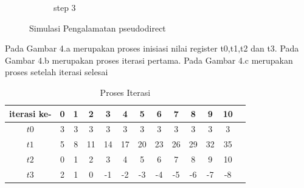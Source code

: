 \documentclass{class}
\begin{document}
\begin{enumerate}
\begin{figure}[H]
\begin{subfigure}{0.5\textwidth}
              \caption{step 3}
              \label{pseudodirect2}
            \end{subfigure}
          \caption{Simulasi Pengalamatan pseudodirect}
          \label{Immediete}
          \end{figure}
      
      Pada Gambar 4.a merupakan proses inisiasi nilai register t0,t1,t2 dan t3.
      Pada Gambar 4.b merupakan proses iterasi pertama.
      Pada Gambar 4.c merupakan proses setelah iterasi selesai

      \begin{table}[H]
          \begin{tabular}{|c|c|c|c|c|c|c|c|c|c|c|c|c|}
              \hline
              iterasi ke- & 0 & 1 & 2 & 3 & 4 & 5 & 6 & 7 & 8 & 9 & 10\\ \hline
              $t0$ & 3 & 3 & 3 & 3 & 3 & 3 & 3 & 3 & 3 & 3 &3 \\ \hline
              $t1$ & 5 & 8 & 11 & 14 & 17 & 20 & 23 & 26 & 29 & 32 &35\\ \hline
              $t2$ & 0 & 1 & 2 & 3 & 4 & 5 & 6 & 7 & 8 & 9 & 10 \\ \hline
              $t3$ & 2 & 1 & 0 & -1 & -2 & -3 & -4 & -5 & -6 & -7 & -8 \\ \hline
          \end{tabular}
          \caption{Proses Iterasi}
      \end{table}

\end{enumerate}
\end{document}
